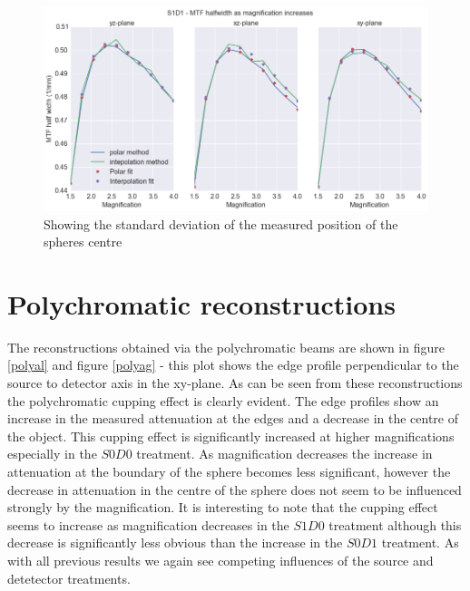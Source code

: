 \documentclass[
  twoside,
  11pt, a4paper,
  footinclude=true,
  headinclude=true,
  cleardoublepage=empty
]{scrbook}
\begin{document}
\begin{figure}[h!]
  \centering
    \includegraphics[width=\textwidth]{figures/S1D1mtf.png}
    \caption{Showing the standard deviation of the measured position of the spheres centre}
        \label{S1D1half}
\end{figure}





\section{Polychromatic reconstructions}

The reconstructions obtained via the polychromatic beams are shown in figure \ref{polyal} and figure \ref{polyag} - this plot shows the edge profile perpendicular to the source to detector axis in the xy-plane. As can be seen from these reconstructions the polychromatic cupping effect is clearly evident. The edge profiles show an increase in the measured attenuation at the edges and a decrease in the centre of the object. This cupping effect is significantly increased at higher magnifications especially in the $S0D0$ treatment. As magnification decreases the increase in attenuation at the boundary of the sphere becomes less significant, however the decrease in attenuation in the centre of the sphere does not seem to be influenced strongly by the magnification. It is interesting to note that the cupping effect seems to increase as magnification decreases in the $S1D0$ treatment although this decrease is significantly less obvious than the increase in the $S0D1$ treatment. As with all previous results we again see competing influences of the source and detetector treatments.
\end{document}

